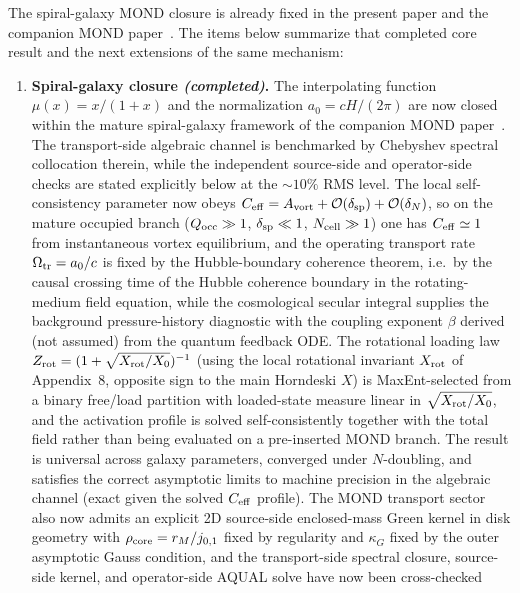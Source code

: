 \documentclass[aps,prd,onecolumn,superscriptaddress,nofootinbib,showpacs,12pt]{revtex4-2}
\begin{document}
The spiral-galaxy MOND closure is already fixed in the
present paper and the companion MOND paper~\cite{Lotishvili2026MOND}.  The items below summarize
that completed core result and the next extensions of the
same mechanism:

\begin{enumerate}
\item \textbf{Spiral-galaxy closure
  \emph{(completed)}.}  The interpolating function
  $\mu(x)=x/(1+x)$ and the normalization
  $a_0=cH/(2\pi)$ are now closed within the mature
  spiral-galaxy framework of the companion MOND paper~\cite{Lotishvili2026MOND}.  The
  transport-side algebraic channel is benchmarked by
  Chebyshev spectral collocation therein, while the independent source-side and
  operator-side checks are stated explicitly below at
  the $\sim10\%$ RMS level.  The local self-consistency parameter
  now obeys
  $C_{\rm eff}=A_{\rm vort}+\mathcal{O}(\delta_{\rm sp})
  +\mathcal{O}(\delta_N)$, so on the mature occupied
  branch ($Q_{\rm occ}\gg1$, $\delta_{\rm sp}\ll1$,
  $N_{\rm cell}\gg1$) one has $C_{\rm eff}\simeq1$ from
  instantaneous vortex equilibrium, and the operating transport rate
  $\Omega_{\rm tr}=a_0/c$ is fixed by the Hubble-boundary
  coherence theorem, i.e.\ by the causal
  crossing time of the Hubble coherence boundary in the
  rotating-medium field equation, while the cosmological secular integral
  supplies the background pressure-history diagnostic
  with the coupling exponent $\beta$ derived (not assumed)
  from the quantum feedback ODE.  The rotational loading law
  $Z_{\rm rot}=(1+\sqrt{X_{\rm rot}/X_0})^{-1}$ (using the local
  rotational invariant $X_{\rm rot}$ of Appendix~8, opposite sign
  to the main Horndeski $X$) is MaxEnt-selected from a
  binary free/load partition with loaded-state measure linear in
  $\sqrt{X_{\rm rot}/X_0}$, and the
  activation profile is solved self-consistently together with the
  total field rather than being evaluated on a pre-inserted MOND branch.
  The result is
  universal across galaxy parameters, converged under
  $N$-doubling, and satisfies the correct asymptotic
  limits to machine precision in the algebraic channel
  (exact given the solved $C_{\rm eff}$ profile).  The MOND transport
  sector also now admits an explicit 2D source-side
  enclosed-mass Green kernel in disk geometry with
  $\rho_{\rm core}=r_M/j_{0,1}$ fixed by regularity and
  $\kappa_G$ fixed by the outer asymptotic Gauss condition,
  and the
  transport-side spectral closure, source-side kernel,
  and operator-side AQUAL solve have now been cross-checked

\end{enumerate}
\end{document}
